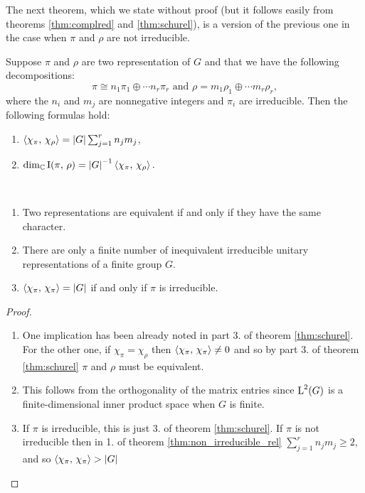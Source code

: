 The next theorem, which we state without proof (but it follows easily from theorems \ref{thm:complred} and \ref{thm:schurel}), is a version of the previous one in the case when $\pi$ and $\rho$ are not irreducible.
\begin{theorem}
\label{thm:non_irreducible_rel}
Suppose $\pi$ and $\rho$ are two representation of $G$ and that we have the following decompositions:
\[
\pi\cong n_1\pi_1\oplus\cdots n_r\pi_r\text{ and $\rho=m_1\rho_1\oplus\cdots m_r\rho_r,$}
\]
where the $n_i$ and $m_j$ are nonnegative integers and $\pi_i$ are irreducible. Then the following formulas hold:
\begin{enumerate}
\item $\braket{\chi_\pi,\, \chi_\rho}=\lvert G\rvert \sum_{j=1}^rn_jm_j$,
\item $ \dim_{\mathbb C}\operatorname{I}(\pi, \, \rho)={\lvert G\rvert}^{-1}\braket{\chi_\pi,\, \chi_\rho}.$
\end{enumerate}
\end{theorem}
\begin{cor}~ 
\begin{enumerate}
\item Two representations are equivalent if and only if they have the same character.
\item There are only a finite number of inequivalent irreducible unitary representations of a finite group $G$.
\item $\braket{\chi_\pi,\, \chi_\pi}=\lvert G\rvert$ if and only if $\pi$ is irreducible.
\end{enumerate}
\end{cor}
\begin{proof}~
\begin{enumerate}
\item One implication has been already noted in part 3. of theorem \ref{thm:schurel}. 
For the  other one, if $\chi_\pi=\chi_\rho$ then $\braket{\chi_\pi,\, \chi_\pi} \neq 0$ and so by part 3. of theorem \ref{thm:schurel} $\pi$ and $\rho$ must be equivalent.
\item  This  follows  from  the orthogonality  of  the matrix  entries  since $\operatorname{L}^{2}(G)$ is a finite-dimensional inner product  space when $G$ is finite.
\item If $\pi$ is irreducible, this is just 3. of theorem \ref{thm:schurel}. If $\pi$ is not irreducible then in 1. of theorem \ref{thm:non_irreducible_rel} $\sum_{j=1}^rn_jm_j\geq 2$, and so  $\braket{\chi_\pi,\, \chi_\pi}>\lvert G\rvert$ 
\end{enumerate}

\end{proof}
